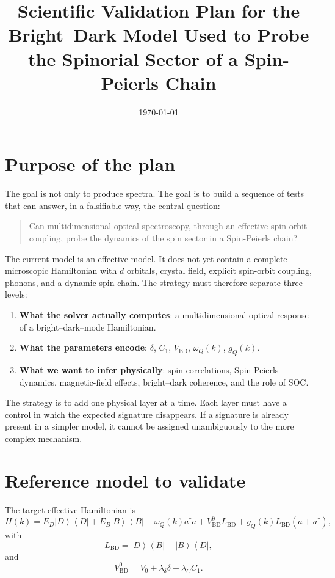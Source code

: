 \documentclass[11pt]{article}
\title{Scientific Validation Plan for the Bright--Dark Model Used to Probe the Spinorial Sector of a Spin-Peierls Chain}
\author{}
\date{\today}
\newcommand{\op}[2]{\left|#1\right\rangle\left\langle #2\right|}
\begin{document}
\maketitle

\section{Purpose of the plan}

The goal is not only to produce spectra. The goal is to build a sequence of tests that can answer, in a falsifiable way, the central question:
\begin{quote}
Can multidimensional optical spectroscopy, through an effective spin-orbit coupling, probe the dynamics of the spin sector in a Spin-Peierls chain?
\end{quote}

The current model is an effective model. It does not yet contain a complete microscopic Hamiltonian with \(d\) orbitals, crystal field, explicit spin-orbit coupling, phonons, and a dynamic spin chain. The strategy must therefore separate three levels:
\begin{enumerate}
    \item \textbf{What the solver actually computes}: a multidimensional optical response of a bright--dark--mode Hamiltonian.
    \item \textbf{What the parameters encode}: \(\delta\), \(C_1\), \(V_{\mathrm{BD}}\), \(\omega_Q(k)\), \(g_Q(k)\).
    \item \textbf{What we want to infer physically}: spin correlations, Spin-Peierls dynamics, magnetic-field effects, bright--dark coherence, and the role of SOC.
\end{enumerate}

The strategy is to add one physical layer at a time. Each layer must have a control in which the expected signature disappears. If a signature is already present in a simpler model, it cannot be assigned unambiguously to the more complex mechanism.

\section{Reference model to validate}

The target effective Hamiltonian is
\begin{equation}
H(k)
=
E_D\op{D}{D}
+
E_B\op{B}{B}
+
\omega_Q(k)a^\dagger a
+
V_{\mathrm{BD}}^0 L_{\mathrm{BD}}
+
g_Q(k)L_{\mathrm{BD}}(a+a^\dagger),
\end{equation}
with
\begin{equation}
L_{\mathrm{BD}}
=
\op{D}{B}+\op{B}{D},
\end{equation}
and
\begin{equation}
V_{\mathrm{BD}}^0
=
V_0+\lambda_\delta\delta+\lambda_C C_1.
\end{equation}
\end{document}
